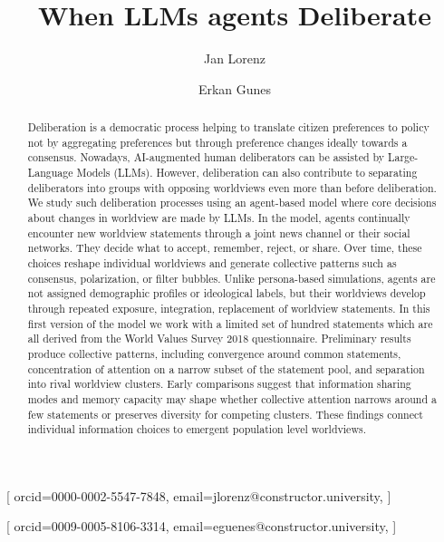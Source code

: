 \documentclass[]{ceurart}
\begin{document}


\title{When LLMs agents Deliberate}
\tnotemark[1]

\author[1]{Jan Lorenz}[%
orcid=0000-0002-5547-7848,%
email=jlorenz@constructor.university,%
]

\author[1]{Erkan Gunes}[%
orcid=0009-0005-8106-3314,%
email=eguenes@constructor.university,%
]


\address[1]{Constructor University, Bremen, Germany}

\begin{abstract}
Deliberation is a democratic process helping to translate citizen
preferences to policy not by aggregating preferences but through
preference changes ideally towards a consensus. Nowadays, AI-augmented
human deliberators can be assisted by Large-Language Models (LLMs).
However, deliberation can also contribute to separating deliberators
into groups with opposing worldviews even more than before deliberation.
We study such deliberation processes using an agent-based model where
core decisions about changes in worldview are made by LLMs. In the
model, agents continually encounter new worldview statements through a
joint news channel or their social networks. They decide what to accept,
remember, reject, or share. Over time, these choices reshape individual
worldviews and generate collective patterns such as consensus,
polarization, or filter bubbles. Unlike persona-based simulations,
agents are not assigned demographic profiles or ideological labels, but
their worldviews develop through repeated exposure, integration,
replacement of worldview statements. In this first version of the model
we work with a limited set of hundred statements which are all derived
from the World Values Survey 2018 questionnaire. Preliminary results
produce collective patterns, including convergence around common
statements, concentration of attention on a narrow subset of the
statement pool, and separation into rival worldview clusters. Early
comparisons suggest that information sharing modes and memory capacity
may shape whether collective attention narrows around a few statements
or preserves diversity for competing clusters. These findings connect
individual information choices to emergent population level worldviews.
\end{abstract}
\end{document}
